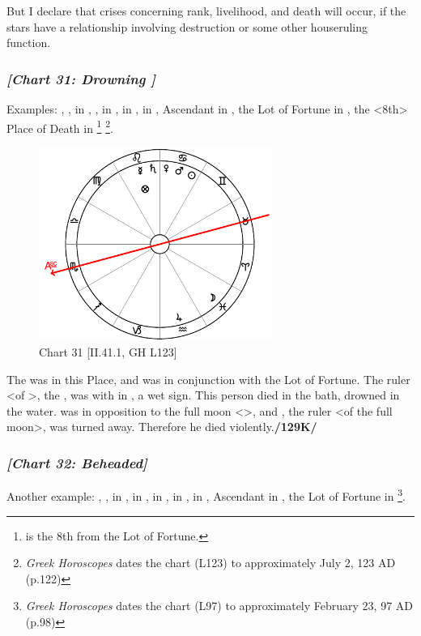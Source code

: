 But I declare that crises concerning rank, livelihood, and death will occur, if the stars have a relationship involving destruction or some other houseruling function.
\newpage
\subsubsection{\textit{[Chart 31: Drowning ]}}
Examples: \Sun, \Mars, \Venus\xspace in \Cancer, \Saturn, \Mercury\xspace in \Leo, \Jupiter\xspace in \Aquarius, \Moon\xspace in \Pisces, Ascendant in \Scorpio, the Lot of Fortune in \Leo, the <8th> Place of Death in \Pisces\footnote{\Pisces\xspace is the 8th from the Lot of Fortune.}
\footnote{\textit{Greek Horoscopes} dates the chart (L123) to approximately July 2, 123 AD (p.122)}.

\clearpage
\begin{figure}
\centering
\includegraphics[width=0.68\textwidth]{charts/2_41_1}
\caption{Chart 31 [II.41.1, GH L123]}
\label{fig:chart31}
\end{figure} 

The \Moon\xspace was in this Place, and \Saturn\xspace was in conjunction with the Lot of Fortune. The ruler <of \Leo>, the \Sun, was with \Mars\xspace in \Cancer, a wet sign. This person died in the bath, drowned in the water. \Mars\xspace was in opposition to the full moon <\Capricorn>, and \Saturn, the ruler <of the full moon>, was turned away. Therefore he died violently.\textbf{/129K/}
\newpage
\subsubsection{\textit{[Chart 32: Beheaded]}}
Another example: \Sun, \Mercury, \Venus\xspace in \Pisces, \Saturn\xspace in \Virgo, \Jupiter\xspace in \Aries, \Mars\xspace in \Taurus, \Moon\xspace in \Sagittarius, Ascendant in \Leo, the Lot of Fortune in \Taurus
\footnote{\textit{Greek Horoscopes} dates the chart (L97) to approximately February 23, 97 AD (p.98)}.  

